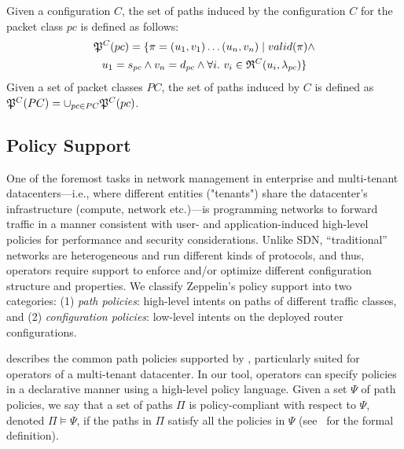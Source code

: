 \begin{definition} \label{def:inducedpaths}
Given a configuration $C$, the set of paths induced
by the configuration $C$ for the packet class $pc$ is defined as follows:
\begin{multline*}
\mathfrak{P}^C(pc) = \{\pi=(u_1, v_1)\ldots (u_n, v_n) \mid 
valid(\pi) \wedge \\
u_1 = s_{pc} \wedge v_n= d_{pc} \wedge
\forall i. ~v_i \in \mathfrak{R}^C(u_i,\lambda_{pc})\}
\end{multline*}
Given a set of packet classes $PC$, the set of paths
 induced by $C$ is defined as
$\mathfrak{P}^C(PC) = \cup_{pc\in PC} \mathfrak{P}^C(pc)$.
\end{definition}

\subsection{Policy Support} \label{sec:policy}

One of the foremost tasks in network management in enterprise 
and multi-tenant datacenters---i.e., where different entities ("tenants") share the datacenter's 
infrastructure (compute, network etc.)---is programming 
networks to forward traffic in a manner consistent with user- and
application-induced high-level policies for performance and security considerations. 
Unlike SDN, ``traditional'' networks are  heterogeneous and run different kinds of 
protocols, and thus, operators require
 support to enforce and/or optimize different
configuration  structure and properties. We 
classify Zeppelin's policy support  into two categories: 
(1) \emph{path policies}: high-level intents on paths of different traffic classes, and 
(2) \emph{configuration policies}: low-level intents on the deployed router configurations. 

  
 describes 
the common path policies 
supported by \name, particularly suited for operators 
of a multi-tenant datacenter. 
In our tool, operators can
specify policies in a declarative manner using a high-level 
policy language. 
Given  a set $\Psi$ of
path policies, we say that
a set of paths $\Pi$ is policy-compliant with respect to $\Psi$, 
denoted  $\Pi \models \Psi$,
if the paths in $\Pi$ satisfy all the policies in $\Psi$ (see~\cite{genesis} for the formal definition). 


